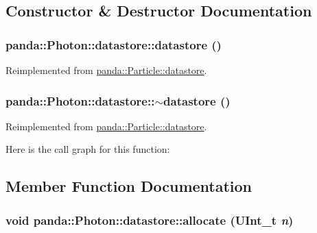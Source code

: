 \subsection{Constructor \& Destructor Documentation}
\hypertarget{structpanda_1_1Photon_1_1datastore_aaaad2d7371a41dbeff49ca7689cf5b08}{
\subsubsection[{datastore}]{\setlength{\rightskip}{0pt plus 5cm}panda::Photon::datastore::datastore ()}}
\label{structpanda_1_1Photon_1_1datastore_aaaad2d7371a41dbeff49ca7689cf5b08}


Reimplemented from \hyperlink{structpanda_1_1Particle_1_1datastore_a6e59a47437e52ced2f9605926e0de284}{panda::Particle::datastore}.\hypertarget{structpanda_1_1Photon_1_1datastore_a7282a7c7cc04a9350041a59e9ecba5b5}{
\subsubsection[{$\sim$datastore}]{\setlength{\rightskip}{0pt plus 5cm}panda::Photon::datastore::$\sim$datastore ()}}
\label{structpanda_1_1Photon_1_1datastore_a7282a7c7cc04a9350041a59e9ecba5b5}


Reimplemented from \hyperlink{structpanda_1_1Particle_1_1datastore_afb2d9f4926afbfa8e0f15f0d8d98094a}{panda::Particle::datastore}.

Here is the call graph for this function:

\subsection{Member Function Documentation}
\hypertarget{structpanda_1_1Photon_1_1datastore_aafdc384cc9e57f60b6acecb3ad82fdb2}{
\subsubsection[{allocate}]{\setlength{\rightskip}{0pt plus 5cm}void panda::Photon::datastore::allocate (UInt\_\-t {\em n})}}
\label{structpanda_1_1Photon_1_1datastore_aafdc384cc9e57f60b6acecb3ad82fdb2}



